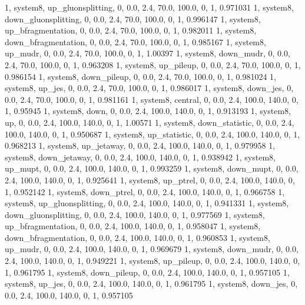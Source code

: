 1, system8, up_gluonsplitting, 0, 0.0, 2.4, 70.0, 100.0, 0, 1, 0.971031
1, system8, down_gluonsplitting, 0, 0.0, 2.4, 70.0, 100.0, 0, 1, 0.996147
1, system8, up_bfragmentation, 0, 0.0, 2.4, 70.0, 100.0, 0, 1, 0.982011
1, system8, down_bfragmentation, 0, 0.0, 2.4, 70.0, 100.0, 0, 1, 0.985167
1, system8, up_mudr,         0, 0.0, 2.4, 70.0, 100.0, 0, 1, 1.00397
1, system8, down_mudr,       0, 0.0, 2.4, 70.0, 100.0, 0, 1, 0.963208
1, system8, up_pileup,       0, 0.0, 2.4, 70.0, 100.0, 0, 1, 0.986154
1, system8, down_pileup,     0, 0.0, 2.4, 70.0, 100.0, 0, 1, 0.981024
1, system8, up_jes,          0, 0.0, 2.4, 70.0, 100.0, 0, 1, 0.986017
1, system8, down_jes,        0, 0.0, 2.4, 70.0, 100.0, 0, 1, 0.981161
1, system8, central,    0, 0.0, 2.4, 100.0, 140.0, 0, 1, 0.95945
1, system8, down,       0, 0.0, 2.4, 100.0, 140.0, 0, 1, 0.913193
1, system8, up,         0, 0.0, 2.4, 100.0, 140.0, 0, 1, 1.00571
1, system8, down_statistic,       0, 0.0, 2.4, 100.0, 140.0, 0, 1, 0.950687
1, system8, up_statistic,         0, 0.0, 2.4, 100.0, 140.0, 0, 1, 0.968213
1, system8, up_jetaway,      0, 0.0, 2.4, 100.0, 140.0, 0, 1, 0.979958
1, system8, down_jetaway,    0, 0.0, 2.4, 100.0, 140.0, 0, 1, 0.938942
1, system8, up_mupt,         0, 0.0, 2.4, 100.0, 140.0, 0, 1, 0.993259
1, system8, down_mupt,       0, 0.0, 2.4, 100.0, 140.0, 0, 1, 0.925641
1, system8, up_ptrel,        0, 0.0, 2.4, 100.0, 140.0, 0, 1, 0.952142
1, system8, down_ptrel,      0, 0.0, 2.4, 100.0, 140.0, 0, 1, 0.966758
1, system8, up_gluonsplitting, 0, 0.0, 2.4, 100.0, 140.0, 0, 1, 0.941331
1, system8, down_gluonsplitting, 0, 0.0, 2.4, 100.0, 140.0, 0, 1, 0.977569
1, system8, up_bfragmentation, 0, 0.0, 2.4, 100.0, 140.0, 0, 1, 0.958047
1, system8, down_bfragmentation, 0, 0.0, 2.4, 100.0, 140.0, 0, 1, 0.960853
1, system8, up_mudr,         0, 0.0, 2.4, 100.0, 140.0, 0, 1, 0.969679
1, system8, down_mudr,       0, 0.0, 2.4, 100.0, 140.0, 0, 1, 0.949221
1, system8, up_pileup,       0, 0.0, 2.4, 100.0, 140.0, 0, 1, 0.961795
1, system8, down_pileup,     0, 0.0, 2.4, 100.0, 140.0, 0, 1, 0.957105
1, system8, up_jes,          0, 0.0, 2.4, 100.0, 140.0, 0, 1, 0.961795
1, system8, down_jes,        0, 0.0, 2.4, 100.0, 140.0, 0, 1, 0.957105

